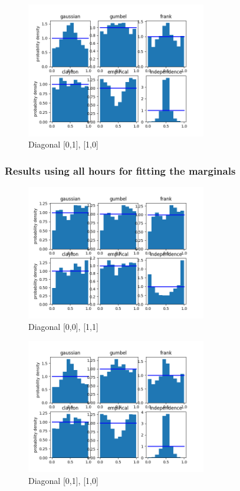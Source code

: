 \begin{figure}[h]
	\centering
	\includegraphics[width=0.7\textwidth]{BPA_2012_2017/2013-01-01_12_00-2013-01-01_13_00-1.png}
	\caption{Diagonal [0,1], [1,0]}
\end{figure}

\clearpage

\subsubsection{Results using all hours for fitting the marginals}



\begin{figure}[h]
	\centering
	\includegraphics[width=0.7\textwidth]{test_more_h/2013-01-01_12_00-2013-01-01_13_00-0.png}
	\caption{Diagonal [0,0], [1,1]}
\end{figure}

\begin{figure}[h]
	\centering
	\includegraphics[width=0.7\textwidth]{test_more_h/2013-01-01_12_00-2013-01-01_13_00-1.png}
	\caption{Diagonal [0,1], [1,0]}
\end{figure}

